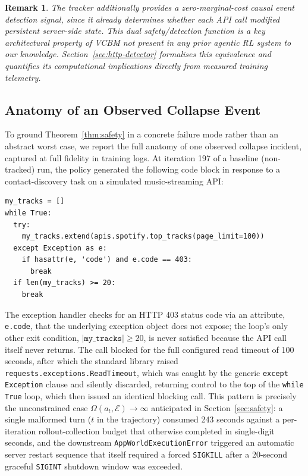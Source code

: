\documentclass[11pt]{article}
\newtheorem{remark}{Remark}
\begin{document}
\begin{remark}
The tracker additionally provides a zero-marginal-cost causal event detection
signal, since it already determines whether each API call modified
persistent server-side state. This dual safety/detection function is a key
architectural property of VCBM not present in any prior agentic RL system to
our knowledge. Section~\ref{sec:http-detector} formalises this equivalence and
quantifies its computational implications directly from measured training
telemetry.
\end{remark}

\subsection{Anatomy of an Observed Collapse Event}
\label{sec:collapse-anatomy}

To ground Theorem~\ref{thm:safety} in a concrete failure mode rather than an
abstract worst case, we report the full anatomy of one observed collapse
incident, captured at full fidelity in training logs. At iteration 197 of a
baseline (non-tracked) run, the policy generated the following code block in
response to a contact-discovery task on a simulated music-streaming API:

\begin{verbatim}
my_tracks = []
while True:
  try:
    my_tracks.extend(apis.spotify.top_tracks(page_limit=100))
  except Exception as e:
    if hasattr(e, 'code') and e.code == 403:
      break
  if len(my_tracks) >= 20:
    break
\end{verbatim}

The exception handler checks for an HTTP 403 status code via an attribute,
\texttt{e.code}, that the underlying exception object does not expose; the
loop's only other exit condition, $|\texttt{my\_tracks}| \geq 20$, is never
satisfied because the API call itself never returns. The call blocked for the
full configured read timeout of 100 seconds, after which the standard library
raised \texttt{requests.exceptions.ReadTimeout}, which was caught by the
generic \texttt{except Exception} clause and silently discarded, returning
control to the top of the \texttt{while True} loop, which then issued an
identical blocking call. This pattern is precisely the unconstrained case
$\Omega(a_t, \mathcal{E}) \rightarrow \infty$ anticipated in
Section~\ref{sec:safety}: a single malformed turn ($t$ in the trajectory)
consumed 243 seconds against a per-iteration rollout-collection budget that
otherwise completed in single-digit seconds, and the downstream
\texttt{AppWorldExecutionError} triggered an automatic server restart sequence
that itself required a forced \texttt{SIGKILL} after a 20-second graceful
\texttt{SIGINT} shutdown window was exceeded.
\end{document}
